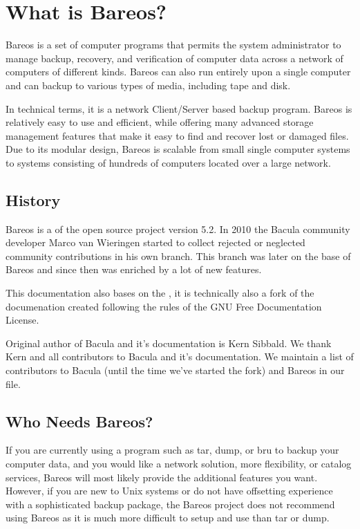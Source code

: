 
\chapter{What is Bareos?}
\label{GeneralChapter}

Bareos is a set of computer programs that permits the system
administrator to manage backup, recovery, and verification of computer data
across a network of computers of different kinds. Bareos can also run entirely
upon a single computer and can backup to various types of media, including tape
and disk.

In technical terms, it is a
network Client/Server based backup program. Bareos is relatively easy to use
and efficient, while offering many advanced storage management features that
make it easy to find and recover lost or damaged files. Due to its modular
design, Bareos is scalable from small single computer systems to systems
consisting of hundreds of computers located over a large network.

\section{History}
\label{History}
Bareos is a  of the open source project 
 version 5.2. 
In 2010 the Bacula community developer Marco van Wieringen started
to collect rejected or neglected community contributions in his own branch.
This branch was later on the base of Bareos and since then was enriched by
a lot of new features.

This documentation also bases on the , it is technically
also a fork of the documenation created following the rules of the GNU Free Documentation License.

Original author of Bacula and it's documentation is Kern Sibbald. We thank Kern and all contributors to Bacula and it's documentation.
We maintain a list of contributors to Bacula (until the time we've started the fork) and Bareos in our  file.


\section{Who Needs Bareos?}

If you are currently using a program such as tar, dump, or
bru to backup your computer data, and you would like a network solution, more
flexibility, or catalog services, Bareos will most likely provide the
additional features you want. However, if you are new to Unix systems or do
not have offsetting experience with a sophisticated backup package, the Bareos project does not
recommend using Bareos as it is much more difficult to setup and use than
tar or dump.

